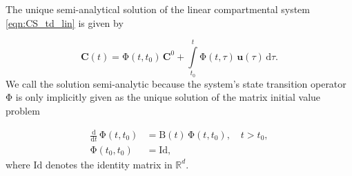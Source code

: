 \documentclass[11pt,a4paper]{article}
\newcommand{\red}[1]{\textcolor{red}{#1}}
\renewcommand{\vec}[1]{\mathbf{#1}}
\newcommand{\tens}[1]{\mathrm{#1}}
\newcommand{\id}{\tens{Id}}
\newcommand{\deriv}[1]{\frac{\mathrm{d}}{\mathrm{d}#1}}
\newcommand{\dd}[1]{\,\mathrm{d}#1}
\newcommand{\intl}{\int\limits}
\newcommand{\R}{\mathbb{R}}
\begin{document}
    The unique semi-analytical solution of the linear compartmental system \eqref{eqn:CS_td_lin} is given by \citep{Brockett2015}
    
    \begin{equation*}
        \vec{C}(t) = \tens{\Phi}(t,t_0)\,\vec{C}^0 + \intl_{t_0}^t \tens{\Phi}(t,\tau)\,\vec{u}(\tau)\dd{\tau}.
    \end{equation*}
    We call the solution semi-analytic because the system's state transition operator $\tens{\Phi}$ is only implicitly given as the unique solution of the matrix initial value problem
    
    \begin{equation*}
        \begin{aligned}
            \deriv{t}\,\tens{\Phi}(t,t_0) &= \tens{B}(t)\,\tens{\Phi}(t,t_0),\quad t>t_0,\\
            \tens{\Phi}(t_0,t_0) &= \id,
        \end{aligned}
    \end{equation*}
    where $\id$ denotes the identity matrix in $\R^d$. 

    
\end{document}
